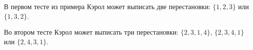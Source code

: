 В первом тесте из примера Кэрол может выписать две перестановки: $\{1, 2, 3\}$ или $\{1, 3, 2\}$.

Во втором тесте Кэрол может выписать три перестановки: $\{2, 3, 1, 4\}$, $\{2, 3, 4, 1\}$ или $\{2, 4, 3, 1\}$.